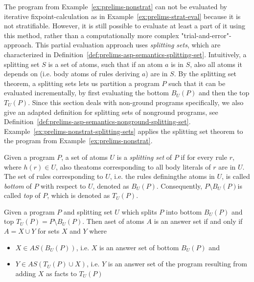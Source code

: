 The program from Example~\ref{ex:prelims-nonstrat} can not be evaluated by iterative fixpoint-calculation as in Example~\ref{ex:prelims-strat-eval} because it is not stratifiable. However, it is still possible to evaluate at least a part of it using this method, rather than a computationally more complex "trial-and-error"-approach. This partial evaluation approach uses \emph{splitting sets}, which are characterized in Definition~\ref{def:prelims-asp-semantics-splitting-set}. Intuitively, a splitting set $S$ is a set of atoms, such that if an atom $a$ is in $S$, also all atoms it depends on (i.e. body atoms of rules deriving $a$) are in $S$. By the splitting set theorem, a splitting sets lets us partition a program $P$ such that it can be evaluated incrementally, by first evaluating the bottom $B_U(P)$ and then the top $T_U(P)$. Since this section deals with non-ground programs specifically, we also give an adapted definition for splitting sets of nonground programs, see Definition~\ref{def:prelims-asp-semantics-nonground-splitting-set}. Example~\ref{ex:prelims-nonstrat-splitting-sets} applies the splitting set theorem to the program from Example~\ref{ex:prelims-nonstrat}.

\begin{definition}
\label{def:prelims-asp-semantics-splitting-set}
Given a program $P$, a set of atoms $U$ is a \emph{splitting set} of $P$ if for every rule $r$, where $h(r) \in U$, also theatoms corresponding to all body literals of $r$ are in $U$. The set of rules corresponding to $U$, i.e. the rules definingthe atoms in $U$, is called \emph{bottom} of $P$ with respect to $U$, denoted as $B_U(P)$. Consequently, $P \setminus B_U(P)$is called \emph{top} of $P$, which is denoted as $T_U(P)$.\\
\end{definition}

\begin{theorem}
Given a program $P$ and splitting set $U$ which splits $P$ into bottom $B_U(P)$ and top $T_U(P) = P \setminus B_U(P)$. Then aset of atoms $A$ is an answer set if and only if $A = X \cup Y$ for sets $X$ and $Y$ where
\begin{itemize}
	\item $X \in AS(B_U(P))$, i.e. $X$ is an answer set of bottom $B_U(P)$ and
	\item $Y \in AS(T_U(P) \cup X)$, i.e. $Y$ is an answer set of the program resulting from adding $X$ as facts to $T_U(P)$ 
\end{itemize}	
\end{theorem}	

